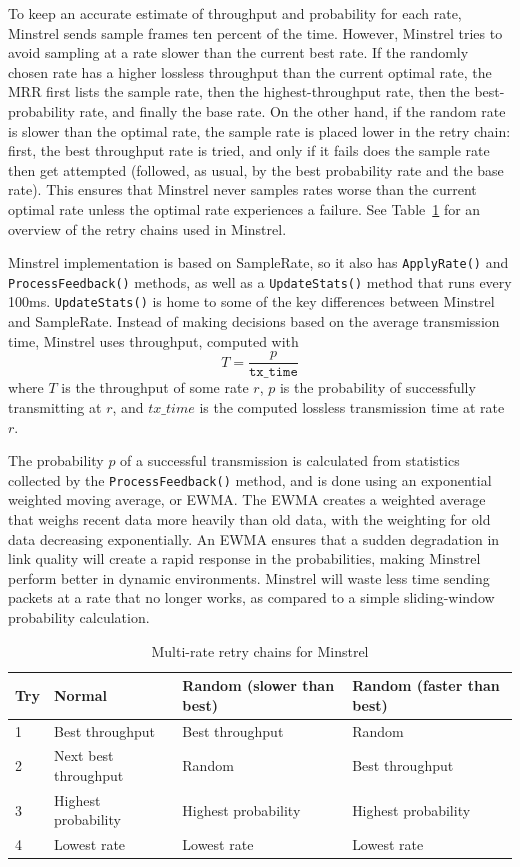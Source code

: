 \documentclass[twocolumn,10pt]{article}
\begin{document}
To keep an accurate estimate of throughput and probability for each
rate, Minstrel sends sample frames ten percent of the time.  However,
Minstrel tries to avoid sampling at a rate slower than the current
best rate.  If the randomly chosen rate has a higher lossless
throughput than the current optimal rate, the MRR first lists the
sample rate, then the highest-throughput rate, then the
best-probability rate, and finally the base rate.  On the other hand,
if the random rate is slower than the optimal rate, the sample rate is
placed lower in the retry chain: first, the best throughput rate is
tried, and only if it fails does the sample rate then get attempted
(followed, as usual, by the best probability rate and the base rate).
This ensures that Minstrel never samples rates worse than the current
optimal rate unless the optimal rate experiences a failure.  See
Table~\ref{table:mrr} for an overview of the retry chains used in
Minstrel.

Minstrel implementation is based on SampleRate, so it also has
\texttt{ApplyRate()} and \texttt{ProcessFeedback()} methods, as well
as a \texttt{UpdateStats()} method that runs every 100ms.
\texttt{UpdateStats()} is home to some of the key differences between
Minstrel and SampleRate.  Instead of making decisions based on the
average transmission time, Minstrel uses throughput, computed with $$T
= \frac{p}{\mathtt{tx\_time}}$$ where $T$ is the throughput of some
rate $r$, $p$ is the probability of successfully transmitting at $r$,
and $tx\_time$ is the computed lossless transmission time at rate $r$.

The probability $p$ of a successful transmission is calculated from
statistics collected by the \texttt{ProcessFeedback()} method, and is
done using an exponential weighted moving average, or EWMA.  The EWMA
creates a weighted average that weighs recent data more heavily than
old data, with the weighting for old data decreasing exponentially.
An EWMA ensures that a sudden degradation in link quality will create
a rapid response in the probabilities, making Minstrel
perform better in dynamic environments.  Minstrel will waste less time
sending packets at a rate that no longer works, as compared to a
simple sliding-window probability calculation.

\begin{table}[htb]
  \centering
    \begin{tabular}[htb]{l|l|l|l}
    \textbf{Try} & \textbf{Normal} &
    \textbf{Random (slower than best)} &
    \textbf{Random (faster than best)} \\ \hline
    1 & Best throughput      & Best throughput     & Random              \\
    2 & Next best throughput & Random              & Best throughput     \\
    3 & Highest probability  & Highest probability & Highest probability \\
    4 & Lowest rate          & Lowest rate         & Lowest rate         \\
    \end{tabular}
    \caption{Multi-rate retry chains for Minstrel}
\label{table:mrr}
\end{table}
\end{document}
